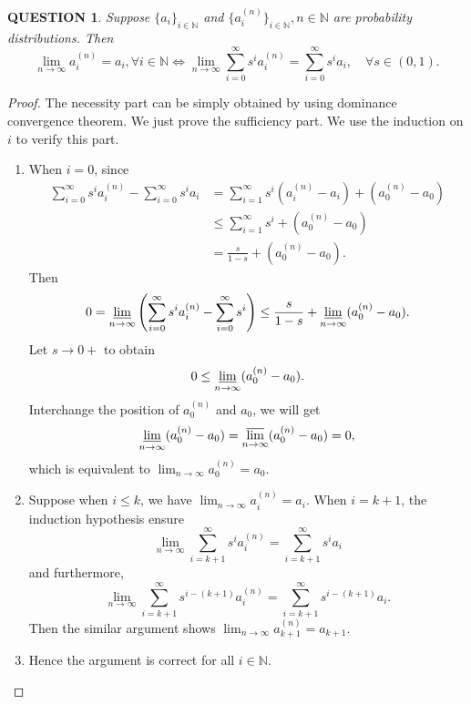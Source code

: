 \documentclass[12pt]{article}
\renewcommand{\(}{\left(}%
\renewcommand{\)}{\right)}%
\renewcommand{\[}{\left[}%
\renewcommand{\]}{\right]}%
\newcommand{\n}{\mathbb{N}}
\newtheorem{question}{QUESTION}[section]}
\newtheorem{proof}{Proof.}}
\begin{document}
  \begin{question}
  	Suppose $\{a_i\}_{i\in\n}$ and $\{a_i^{(n)}\}_{i\in\n},n\in\n$ are probability distributions. Then 
  	\begin{equation*}
  		\lim_{n\to\infty}a_i^{(n)}= a_i,\forall i\in\n\Longleftrightarrow \lim_{n\to\infty}\sum_{i=0}^\infty s^ia_i^{(n)}=\sum_{i=0}^\infty s^i a_i,\quad \forall s\in(0,1).
  	\end{equation*}
  \end{question}
  \begin{proof}
  	The necessity part can be simply obtained by using dominance convergence theorem. We just prove the sufficiency part. We use the induction on $i$ to verify this part.
  	\begin{enumerate}
  		\item When $i=0$, since
  	\begin{equation*}
  		\begin{split}
  			\sum_{i=0}^\infty s^ia_i^{(n)}-\sum_{i=0}^\infty s^i a_i&=\sum_{i=1}^\infty s^i(a_i^{(n)}-a_i)+(a_0^{(n)}-a_0)\\
  			&\leq \sum_{i=1}^\infty s^i+(a_0^{(n)}-a_0)\\
  			&=\frac{s}{1-s}+(a_0^{(n)}-a_0).
  		\end{split}
  	\end{equation*}
  	Then
  	\begin{equation*}
  		0=\varliminf_{n\to\infty}\(\sum_{i=0}^\infty s^ia_i^{(n)}-\sum_{i=0}^\infty s^i\)\leq \frac{s}{1-s}+\varliminf_{n\to\infty} (a_0^{(n)}-a_0).
  	\end{equation*}
  	Let $s\to0+$ to obtain
  	\begin{equation*}
  		0\leq \varliminf_{n\to\infty} (a_0^{(n)}-a_0).
  	\end{equation*}
  	Interchange the position of $a_0^{(n)}$ and $a_0$, we will get 
  	\begin{equation*}
  		\varliminf_{n\to\infty} (a_0^{(n)}-a_0)= \varlimsup_{n\to\infty} (a_0^{(n)}-a_0)=0,
  	\end{equation*}
  	which is equivalent to $\lim_{n\to\infty}a_0^{(n)}=a_0$.
  		\item Suppose when $i\leq k$, we have $\lim_{n\to\infty}a_i^{(n)}=a_i$. When $i=k+1$, the induction hypothesis ensure 
  		\begin{equation*}
  			\lim_{n\to\infty}\sum_{i=k+1}^\infty s^ia_i^{(n)}=\sum_{i=k+1}^\infty s^i a_i
  		\end{equation*}
  		and furthermore, 
  		\begin{equation*}
  			\lim_{n\to\infty}\sum_{i=k+1}^\infty s^{i-(k+1)}a_i^{(n)}=\sum_{i=k+1}^\infty s^{i-(k+1)} a_i.
  		\end{equation*}
  		Then the similar argument shows $\lim_{n\to\infty}a_{k+1}^{(n)}=a_{k+1}$.
  		\item Hence the argument is correct for all $i\in\n$.
  	\end{enumerate}
  \end{proof}
  
\end{document}
